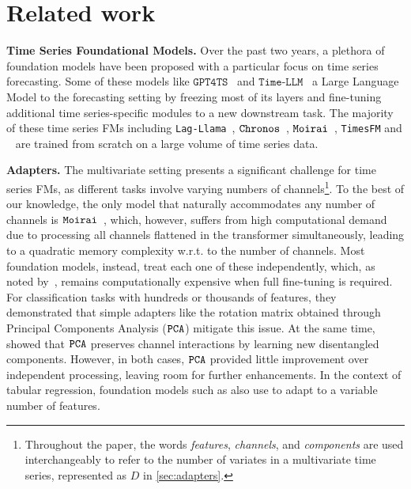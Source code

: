 \section{Related work}
\label{sec:related}

\noindent\textbf{Time Series Foundational Models.} Over the past two years, a plethora of foundation models have been proposed with a particular focus on time series forecasting. Some of these models like $\texttt{GPT4TS}$~\citep{zhou2023onefitsall} and $\texttt{Time-LLM}$~\citep{jin2023time}  a Large Language Model to the forecasting setting by freezing most of its layers and fine-tuning additional time series-specific modules to a new downstream task. The majority of these time series FMs including \texttt{Lag-Llama}~\citep{rasul2024lagllama}, $\texttt{Chronos}$~\citep{ansari2024chronos}, $\texttt{Moirai}$~\citep{liu2024moirai}, \texttt{TimesFM} \citep{das2024a} and \moment~\citep{goswami2024moment} are trained from scratch on a large volume of time series data.

\noindent\textbf{Adapters.} The multivariate setting presents a significant challenge for time series FMs, as different tasks involve varying numbers of channels\footnote{Throughout the paper, the words \emph{features}, \emph{channels}, and \emph{components} are used interchangeably to refer to the number of variates in a multivariate time series, represented as $D$ in \cref{sec:adapters}.}. To the best of our knowledge, the only model that naturally accommodates any number of channels is $\texttt{Moirai}$~\citep{liu2024moirai}, which, however, suffers from high computational demand due to processing all channels flattened in the transformer simultaneously, leading to a quadratic memory complexity w.r.t. to the number of channels. Most foundation models, instead, treat each one of these independently, which, as noted by~\citet{feofanov2024adapters}, remains computationally expensive when full fine-tuning is required. For classification tasks with hundreds or thousands of features, they demonstrated that simple adapters like the rotation matrix obtained through Principal Components Analysis ($\texttt{PCA}$) mitigate this issue. At the same time,~\citet{benechehab2025zeroshot} showed that $\texttt{PCA}$ preserves channel interactions by learning new disentangled components. However, in both cases, $\texttt{PCA}$ provided little improvement over independent processing, leaving room for further enhancements. In the context of tabular regression, foundation models such as \citep[$\texttt{TabDPT}$]{ma2024tabdptscalingtabularfoundation} also use \pca to adapt to a variable number of features. 

